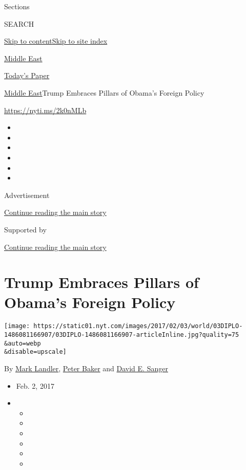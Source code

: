 Sections

SEARCH

\protect\hyperlink{site-content}{Skip to
content}\protect\hyperlink{site-index}{Skip to site index}

\href{https://www.nytimes.com/section/world/middleeast}{Middle East}

\href{https://myaccount.nytimes.com/auth/login?response_type=cookie\&client_id=vi}{}

\href{https://www.nytimes.com/section/todayspaper}{Today's Paper}

\href{/section/world/middleeast}{Middle East}\textbar{}Trump Embraces
Pillars of Obama's Foreign Policy

\url{https://nyti.ms/2k0nMLb}

\begin{itemize}
\item
\item
\item
\item
\item
\item
\end{itemize}

Advertisement

\protect\hyperlink{after-top}{Continue reading the main story}

Supported by

\protect\hyperlink{after-sponsor}{Continue reading the main story}

\hypertarget{trump-embraces-pillars-of-obamas-foreign-policy}{%
\section{Trump Embraces Pillars of Obama's Foreign
Policy}\label{trump-embraces-pillars-of-obamas-foreign-policy}}

\texttt{[image: https://static01.nyt.com/images/2017/02/03/world/03DIPLO-1486081166907/03DIPLO-1486081166907-articleInline.jpg?quality=75\\\&auto=webp\\\&disable=upscale]}

By \href{http://www.nytimes.com/by/mark-landler}{Mark Landler},
\href{http://www.nytimes.com/by/peter-baker}{Peter Baker} and
\href{http://www.nytimes.com/by/david-e-sanger}{David E. Sanger}

\begin{itemize}
\item
  Feb. 2, 2017
\item
  \begin{itemize}
  \item
  \item
  \item
  \item
  \item
  \item
  \end{itemize}
\end{itemize}

